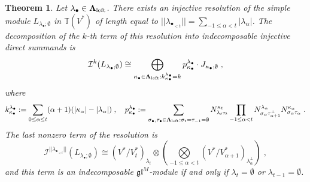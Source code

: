 \documentclass[12pt]{article}
\def\TT {{\mathbb T}}     %
\def\mc {\mathcal}
\def\mk {\mathfrak}
\newtheorem{theorem}{Theorem}[section]
\begin{document}
\begin{theorem}\label{Theo InjResLlambdabullet}
Let $\lambda_\bullet\in\bm\Lambda_{\rm left}$. There exists an injective resolution of the simple module $L_{\lambda_\bullet;\emptyset}$ in $\TT(V^*)$ of length equal to $||\lambda_{\bullet_{<t}}||=\sum\limits_{-1\leq\alpha<t} |\lambda_\alpha|$. The decomposition of the $k$-th term of this resolution into indecomposable injective direct summands is
$$
\mc I^k(L_{\lambda_\bullet;\emptyset}) \cong \bigoplus\limits_{\kappa_\bullet\in\bm\Lambda_{\rm left}: k^{\lambda_\bullet}_{\kappa_\bullet}=k} 
p^{\lambda_\bullet}_{\kappa_\bullet} \cdot J_{\kappa_\bullet;\emptyset} \;,
$$
where
\begin{gather}\label{For klambdakappa plambdakappa}
k^{\lambda_\bullet}_{\kappa_\bullet}:=\sum\limits_{0\leq\alpha\leq t} (\alpha+1)(|\kappa_\alpha|-|\lambda_\alpha|)\;,\quad p^{\lambda_\bullet}_{\kappa_\bullet} := \sum\limits_{\sigma_\bullet,\tau_\bullet\in\bm\Lambda_{\rm left}:\sigma_t=\tau_{-1}=\emptyset} N^{\kappa_t}_{\lambda_t \tau_t} \prod\limits_{-1\leq\alpha<t} N^{\lambda_\alpha}_{\sigma_\alpha \tau_{\alpha+1}^\perp} N^{\kappa_\alpha}_{\sigma_\alpha \tau_\alpha}\;.
\end{gather}
The last nonzero term of the resolution is
$$
\mc I^{||\lambda_{\bullet_{<t}}||}(L_{\lambda_\bullet;\emptyset}) \cong (V^*/V^*_{t})_{\lambda_t} \otimes \left( \bigotimes\limits_{-1\leq\alpha<t} (V^*/V^*_{\alpha+1})_{\lambda_{\alpha}^{\perp}} \right) \;,
$$
and this term is an indecomposable $\mk{gl}^M$-module if and only if $\lambda_t=\emptyset$ or $\lambda_{t-1}=\emptyset$.
\end{theorem}
\end{document}
